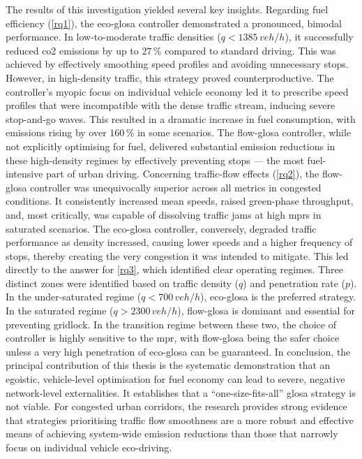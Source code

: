 \mynewline
The results of this investigation yielded several key insights. Regarding fuel efficiency (\ref{rq1}), the \ac{eco-glosa} controller demonstrated a pronounced, bimodal performance. In low-to-moderate traffic densities ($q < 1385\,\unit{veh/h}$), it successfully reduced \ac{co2} emissions by up to $27\,\%$ compared to standard driving. This was achieved by effectively smoothing speed profiles and avoiding unnecessary stops. However, in high-density traffic, this strategy proved counterproductive. The controller's myopic focus on individual vehicle economy led it to prescribe speed profiles that were incompatible with the dense traffic stream, inducing severe stop-and-go waves. This resulted in a dramatic increase in fuel consumption, with emissions rising by over $160\,\%$ in some scenarios. The \ac{flow-glosa} controller, while not explicitly optimising for fuel, delivered substantial emission reductions in these high-density regimes by effectively preventing stops --- the most fuel-intensive part of urban driving.
\mynewline
Concerning traffic-flow effects (\ref{rq2}), the \ac{flow-glosa} controller was unequivocally superior across all metrics in congested conditions. It consistently increased mean speeds, raised green-phase throughput, and, most critically, was capable of dissolving traffic jams at high \acp{mpr} in saturated scenarios. The \ac{eco-glosa} controller, conversely, degraded traffic performance as density increased, causing lower speeds and a higher frequency of stops, thereby creating the very congestion it was intended to mitigate.
\mynewline
This led directly to the answer for \ref{rq3}, which identified clear operating regimes. Three distinct zones were identified based on traffic density ($q$) and penetration rate ($p$). In the under-saturated regime ($q < 700\,\unit{veh/h}$), \ac{eco-glosa} is the preferred strategy. In the saturated regime ($q > 2300\,\unit{veh/h}$), \ac{flow-glosa} is dominant and essential for preventing gridlock. In the transition regime between these two, the choice of controller is highly sensitive to the \ac{mpr}, with \ac{flow-glosa} being the safer choice unless a very high penetration of \ac{eco-glosa} can be guaranteed.
\mynewline
In conclusion, the principal contribution of this thesis is the systematic demonstration that an egoistic, vehicle-level optimisation for fuel economy can lead to severe, negative network-level externalities. It establishes that a \enquote{one-size-fits-all} \ac{glosa} strategy is not viable. For congested urban corridors, the research provides strong evidence that strategies prioritising traffic flow smoothness are a more robust and effective means of achieving system-wide emission reductions than those that narrowly focus on individual vehicle eco-driving.

